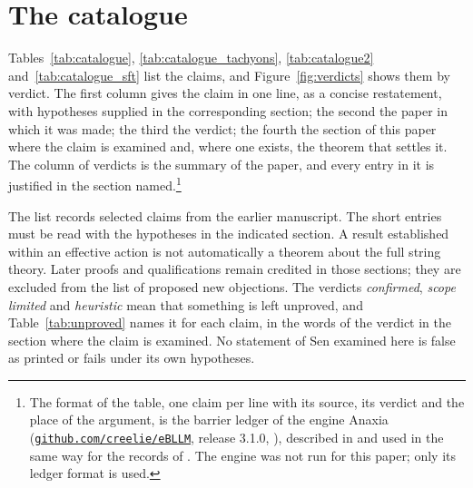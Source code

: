 \section{The catalogue}\label{sec:catalogue}

Tables~\ref{tab:catalogue}, \ref{tab:catalogue_tachyons}, \ref{tab:catalogue2} and~\ref{tab:catalogue_sft} list the claims, and Figure~\ref{fig:verdicts} shows them by verdict. The first column gives the claim in one line, as a concise restatement, with hypotheses supplied in the corresponding section; the second the paper in which it was made; the third the verdict; the fourth the section of this paper where the claim is examined and, where one exists, the theorem that settles it. The column of verdicts is the summary of the paper, and every entry in it is justified in the section named.\footnote{The format of the table, one claim per line with its source, its verdict and the place of the argument, is the barrier ledger of the engine Anaxia (\href{https://github.com/creelie/eBLLM}{\nolinkurl{github.com/creelie/eBLLM}}, release 3.1.0, \anaxiaDOIlink{}), described in \cite{BLLM26} and used in the same way for the records of \cite{Dwork26,YM26}. The engine was not run for this paper; only its ledger format is used.}

The list records selected claims from the earlier manuscript. The short entries must be read with the hypotheses in the indicated section. A result established within an effective action is not automatically a theorem about the full string theory. Later proofs and qualifications remain credited in those sections; they are excluded from the list of proposed new objections. The verdicts \emph{confirmed}, \emph{scope limited} and \emph{heuristic} mean that something is left unproved, and Table~\ref{tab:unproved} names it for each claim, in the words of the verdict in the section where the claim is examined. No statement of Sen examined here is false as printed or fails under its own hypotheses.

